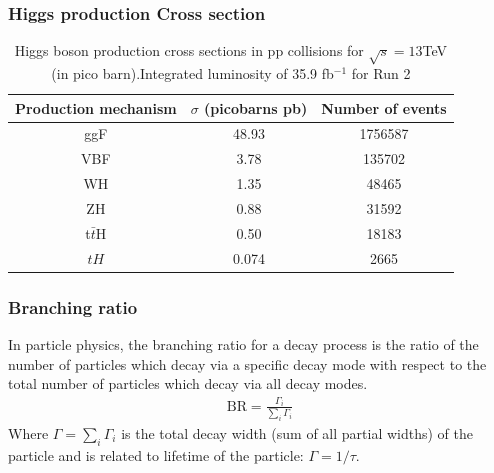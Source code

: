 \documentclass[11pt]{beamer}
\begin{document}
\begin{frame}
\frametitle{Higgs production Cross section}
\begin{table}
	\caption*{Higgs boson production cross sections  in pp collisions for $\sqrt{s}=13$TeV  (in
		pico barn).Integrated luminosity of 35.9 fb$^{-1}$ for Run 2\footnotemark}
	\begin{tabular}{|c|c|c|}
		\hline
		Production mechanism &
		$\sigma$ (picobarns pb)
		&Number of events \\
		\hline
		ggF &
		48.93 &
		1756587\\
		\hline
		VBF &
		3.78&
		135702\\
		\hline
		WH & 1.35 & 48465\\
		\hline
		ZH &0.88 & 31592\\
		\hline
		t$\bar{t}$H &
		0.50&
		18183\\
		\hline
		$tH$ &
		0.074&
		2665\\
		\hline
	\end{tabular}
\end{table}
\end{frame}



\begin{frame}
\frametitle{Branching ratio}
\small{In particle physics, the branching ratio for a decay process is the ratio of the number of particles which decay via a specific decay mode with respect to the total number of particles which decay via all decay modes.}
\begin{align}
\text{BR} =\frac{\Gamma_i}{\sum_{i}\Gamma_i}
\end{align}
\small{Where $\Gamma=\sum_i\Gamma_i$ is the total decay width (sum of all partial widths) of the particle and is related to lifetime of the particle: $\Gamma=1/\tau$.}
\end{frame}
 
\end{document}

